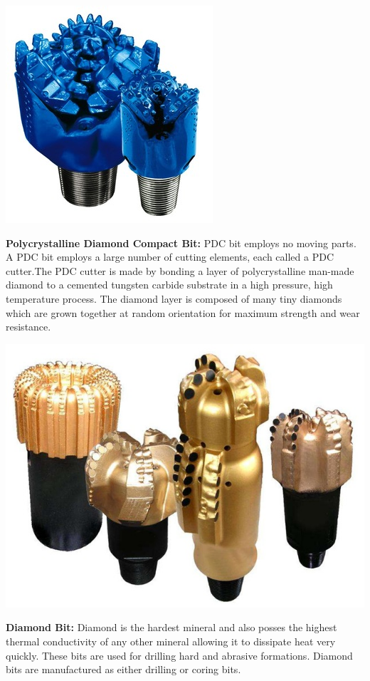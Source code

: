 \vspace{1em}

\includegraphics[scale=0.3]{images/Rollerconebits}

\textbf{Polycrystalline Diamond Compact Bit:} PDC bit employs no moving parts. 
A PDC bit employs a large number of cutting elements, each called a PDC cutter.The PDC cutter is made 
by bonding a layer of polycrystalline man-made diamond to a cemented tungsten 
carbide substrate in a high pressure, high temperature process. 
The diamond layer is composed of many tiny diamonds which are grown together at random orientation for maximum strength and wear resistance.

\vspace{1em}

\includegraphics[scale=0.3]{images/PDCbits}

\textbf{Diamond Bit:} Diamond is the hardest mineral and also posses the highest thermal conductivity 
of any other mineral allowing it to dissipate heat very quickly. 
These bits are used for drilling hard and
abrasive formations. Diamond bits are manufactured as either drilling or coring bits.



